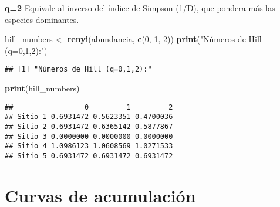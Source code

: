 \documentclass[
]{article}
\newenvironment{Shaded}{\begin{snugshade}}{\end{snugshade}}
\newcommand{\DecValTok}[1]{\textcolor[rgb]{0.00,0.00,0.81}{#1}}
\newcommand{\FunctionTok}[1]{\textcolor[rgb]{0.13,0.29,0.53}{\textbf{#1}}}
\newcommand{\NormalTok}[1]{#1}
\newcommand{\OtherTok}[1]{\textcolor[rgb]{0.56,0.35,0.01}{#1}}
\newcommand{\StringTok}[1]{\textcolor[rgb]{0.31,0.60,0.02}{#1}}
\begin{document}
\textbf{q=2} Equivale al inverso del índice de Simpson (1/D), que
pondera más las especies dominantes.

\begin{Shaded}
\begin{Highlighting}[]
\NormalTok{hill\_numbers }\OtherTok{\textless{}{-}} \FunctionTok{renyi}\NormalTok{(abundancia, }\FunctionTok{c}\NormalTok{(}\DecValTok{0}\NormalTok{, }\DecValTok{1}\NormalTok{, }\DecValTok{2}\NormalTok{))}
\FunctionTok{print}\NormalTok{(}\StringTok{"Números de Hill (q=0,1,2):"}\NormalTok{)}
\end{Highlighting}
\end{Shaded}

\begin{verbatim}
## [1] "Números de Hill (q=0,1,2):"
\end{verbatim}

\begin{Shaded}
\begin{Highlighting}[]
\FunctionTok{print}\NormalTok{(hill\_numbers)}
\end{Highlighting}
\end{Shaded}

\begin{verbatim}
##                 0         1         2
## Sitio 1 0.6931472 0.5623351 0.4700036
## Sitio 2 0.6931472 0.6365142 0.5877867
## Sitio 3 0.0000000 0.0000000 0.0000000
## Sitio 4 1.0986123 1.0608569 1.0271533
## Sitio 5 0.6931472 0.6931472 0.6931472
\end{verbatim}

\hypertarget{curvas-de-acumulaciuxf3n}{%
\section{Curvas de acumulación}\label{curvas-de-acumulaciuxf3n}}
\end{document}
